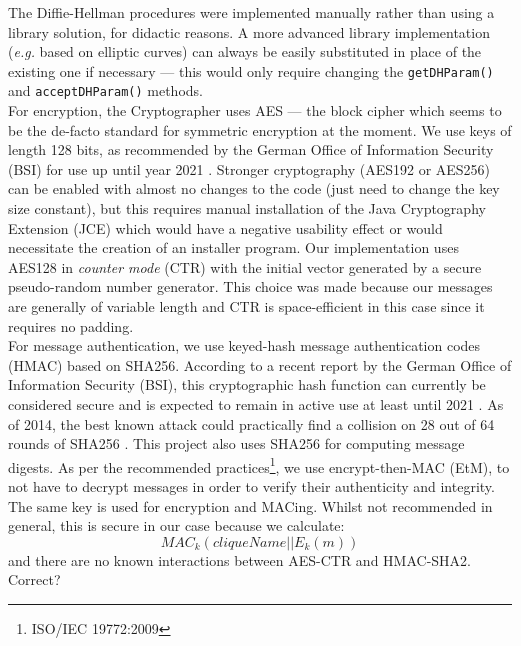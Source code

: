 \documentclass[a4paper, 12pt]{report}
\begin{document}
The Diffie-Hellman procedures were implemented manually rather than using a library solution, for didactic reasons. A more advanced library implementation (\textit{e.g.} based on elliptic curves) can always be easily substituted in place of the existing one if necessary --- this would only require changing the \texttt{getDHParam()} and \texttt{acceptDHParam()} methods. \\ 

For encryption, the Cryptographer uses AES --- the block cipher which seems to be the de-facto standard for symmetric encryption at the moment. We use keys of length 128 bits, as recommended by the German Office of Information Security (BSI) for use up until year 2021 \cite{margraf2016kryptographische}. Stronger cryptography (AES192 or AES256) can be enabled with almost no changes to the code (just need to change the key size constant), but this requires manual installation of the Java Cryptography Extension (JCE) which would have a negative usability effect or would necessitate the creation of an installer program. Our implementation uses AES128 in \emph{counter mode} (CTR) with the initial vector generated by a secure pseudo-random number generator. This choice was made because our messages are generally of variable length and CTR is space-efficient in this case since it requires no padding. \\

For message authentication, we use keyed-hash message authentication codes (HMAC) based on SHA256. According to a recent report by the German Office of Information Security (BSI), this cryptographic hash function can currently be considered secure and is expected to remain in active use at least until 2021 \cite{margraf2016kryptographische}. As of 2014, the best known attack could practically find a collision on 28 out of 64 rounds of SHA256 \cite{dobraunig2014analysis}. This project also uses SHA256 for computing message digests. As per the recommended practices\footnote{ISO/IEC 19772:2009}, we use encrypt-then-MAC (EtM), to not have to decrypt messages in order to verify their authenticity and integrity. \\

The same key is used for encryption and MACing. Whilst not recommended in general, this is secure in our case because we calculate:
\begin{equation*}
    MAC_k(cliqueName||E_k(m))
\end{equation*}
and there are no known interactions between AES-CTR and HMAC-SHA2. {\color{red}Correct?}
\end{document}

